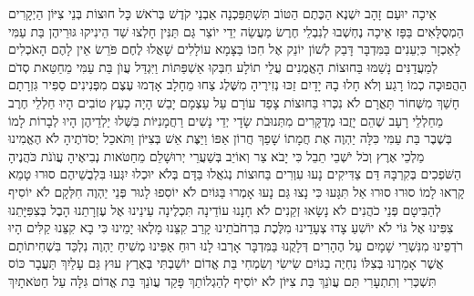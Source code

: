 \documentclass[../main/main.tex]{subfiles}
\begin{document}
\begin{multicols}{\ncols}
אֵיכָה יוּעַם זָהָב יִשְׁנֶא הַכֶּתֶם הַטּוֹב תִּשְׁתַּפֵּכְנָה אַבְנֵי קֹדֶשׁ בְּרֹאשׁ כָּל חוּצוֹת \ClosedSection{}בְּנֵי צִיּוֹן הַיְקָרִים הַמְסֻלָּאִים בַּפָּז אֵיכָה נֶחְשְׁבוּ לְנִבְלֵי חֶרֶשׂ מַעֲשֵׂה יְדֵי יוֹצֵר \ClosedSection{}גַּם תַּנִּין חָלְצוּ שַׁד הֵינִיקוּ גּוּרֵיהֶן בַּת עַמִּי לַאַכְזָר\SubEnd{} כִּיְעֵנִים\SubEnd{} בַּמִּדְבָּר \ClosedSection{}דָּבַק לְשׁוֹן יוֹנֵק אֶל חִכּוֹ בַּצָּמָא עוֹלָלִים שָׁאֲלוּ לֶחֶם פֹּרֵשׂ אֵין לָהֶם \ClosedSection{}הָאֹכְלִים לְמַעֲדַנִּים נָשַׁמּוּ בַּחוּצוֹת הָאֱמֻנִים עֲלֵי תוֹלָע חִבְּקוּ אַשְׁפַּתּוֹת \ClosedSection{}וַיִּגְדַּל עֲוֺן בַּת עַמִּי מֵחַטַּאת סְדֹם הַהֲפוּכָה כְמוֹ רָגַע וְלֹא חָלוּ בָהּ יָדָיִם \ClosedSection{}זַכּוּ נְזִירֶיהָ מִשֶּׁלֶג צַחוּ מֵחָלָב אָדְמוּ עֶצֶם מִפְּנִינִים סַפִּיר גִּזְרָתָם \ClosedSection{}חָשַׁךְ מִשְּׁחוֹר תָּאֳרָם לֹא נִכְּרוּ בַּחוּצוֹת צָפַד עוֹרָם עַל עַצְמָם יָבֵשׁ הָיָה כָעֵץ \ClosedSection{}טוֹבִים הָיוּ חַלְלֵי חֶרֶב מֵחַלְלֵי רָעָב שֶׁהֵם יָזֻבוּ מְדֻקָּרִים מִתְּנוּבֹת שָׂדָי \ClosedSection{}יְדֵי נָשִׁים רַחֲמָנִיּוֹת בִּשְּׁלוּ יַלְדֵיהֶן הָיוּ לְבָרוֹת לָמוֹ בְּשֶׁבֶר בַּת עַמִּי \ClosedSection{}כִּלָּה יַהְוֶה אֶת חֲמָתוֹ שָׁפַךְ חֲרוֹן אַפּוֹ וַיַּצֶּת אֵשׁ בְּצִיּוֹן וַתֹּאכַל יְסֹדֹתֶיהָ \ClosedSection{}לֹא הֶאֱמִינוּ מַלְכֵי אֶרֶץ וְכֹל יֹשְׁבֵי תֵבֵל כִּי יָבֹא צַר וְאוֹיֵב בְּשַׁעֲרֵי יְרוּשָׁלֵם \ClosedSection{}מֵחַטֹּאות נְבִיאֶיהָ עֲוֺנֹת כֹּהֲנֶיהָ הַשֹּׁפְכִים בְּקִרְבָּהּ דַּם צַדִּיקִים \ClosedSection{}נָעוּ עִוְרִים בַּחוּצוֹת נְגֹאֲלוּ בַּדָּם בְּלֹא יוּכְלוּ יִגְּעוּ בִּלְבֻשֵׁיהֶם \ClosedSection{}סוּרוּ טָמֵא קָרְאוּ לָמוֹ סוּרוּ סוּרוּ אַל תִּגָּעוּ כִּי נָצוּ גַּם נָעוּ אָמְרוּ בַּגּוֹיִם לֹא יוֹסִפוּ לָגוּר \ClosedSection{}פְּנֵי יַהְוֶה חִלְּקָם לֹא יוֹסִיף לְהַבִּיטָם פְּנֵי כֹהֲנִים לֹא נָשָׂאוּ זְקֵנִים לֹא חָנָנוּ \ClosedSection{}עוֹדֵינָה תִּכְלֶינָה עֵינֵינוּ אֶל עֶזְרָתֵנוּ הָבֶל בְּצִפִּיָּתֵנוּ צִפִּינוּ אֶל גּוֹי לֹא יוֹשִׁעַ \ClosedSection{}צָדוּ צְעָדֵינוּ מִלֶּכֶת בִּרְחֹבֹתֵינוּ קָרַב קִצֵּנוּ מָלְאוּ יָמֵינוּ כִּי בָא קִצֵּנוּ \ClosedSection{}קַלִּים הָיוּ רֹדְפֵינוּ מִנִּשְׁרֵי שָׁמָיִם עַל הֶהָרִים דְּלָקֻנוּ בַּמִּדְבָּר אָרְבוּ לָנוּ \ClosedSection{}רוּחַ אַפֵּינוּ מְשִׁיחַ יַהְוֶה נִלְכַּד בִּשְׁחִיתוֹתָם אֲשֶׁר אָמַרְנוּ בְּצִלּוֹ נִחְיֶה בַגּוֹיִם \ClosedSection{}שִׂישִׂי וְשִׂמְחִי בַּת אֱדוֹם יוֹשַׁבְתִּי בְּאֶרֶץ עוּץ גַּם עָלַיִךְ תַּעֲבָר כּוֹס תִּשְׁכְּרִי וְתִתְעָרִי \ClosedSection{}תַּם עֲוֺנֵךְ בַּת צִיּוֹן לֹא יוֹסִיף לְהַגְלוֹתֵךְ פָּקַד עֲוֺנֵךְ בַּת אֱדוֹם גִּלָּה עַל חַטֹּאתָיִךְ\OpenSection{}\par

\end{multicols}
\end{document}
